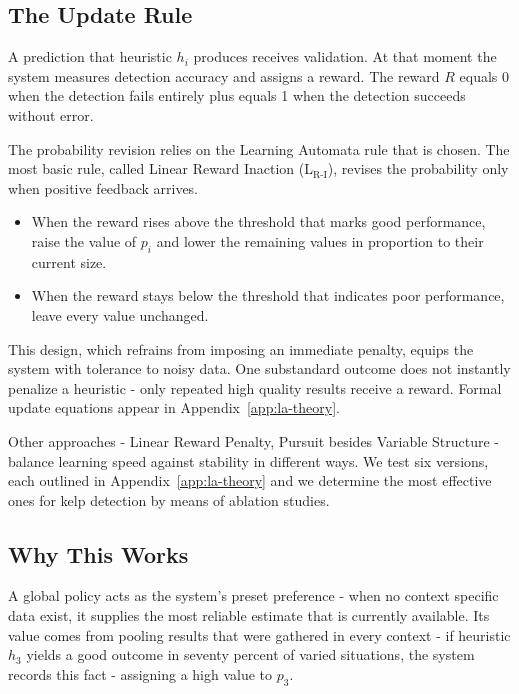 \documentclass[11pt,a4paper]{article}
\begin{document}
\subsection{The Update Rule}

A prediction that heuristic $h_i$ produces receives validation. At that moment the system measures detection accuracy and assigns a reward. The reward $R$ equals 0 when the detection fails entirely plus equals 1 when the detection succeeds without error.

The probability revision relies on the Learning Automata rule that is chosen. The most basic rule, called Linear Reward Inaction (L$_{\text{R-I}}$), revises the probability only when positive feedback arrives.

\begin{itemize}
\item When the reward rises above the threshold that marks good performance, raise the value of $p_i$ and lower the remaining values in proportion to their current size.
\item When the reward stays below the threshold that indicates poor performance, leave every value unchanged.
\end{itemize}

This design, which refrains from imposing an immediate penalty, equips the system with tolerance to noisy data. One substandard outcome does not instantly penalize a heuristic - only repeated high quality results receive a reward. Formal update equations appear in Appendix~\ref{app:la-theory}.

Other approaches - Linear Reward Penalty, Pursuit besides Variable Structure - balance learning speed against stability in different ways. We test six versions, each outlined in Appendix~\ref{app:la-theory} and we determine the most effective ones for kelp detection by means of ablation studies.

\subsection{Why This Works}

A global policy acts as the system's preset preference - when no context specific data exist, it supplies the most reliable estimate that is currently available. Its value comes from pooling results that were gathered in every context - if heuristic $h_3$ yields a good outcome in seventy percent of varied situations, the system records this fact - assigning a high value to $p_3$.
\end{document}
